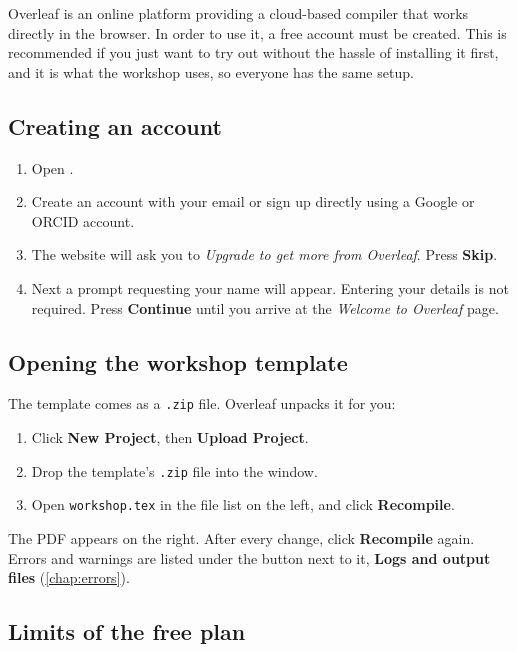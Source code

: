 Overleaf is an online platform providing a cloud-based  compiler that works directly in the browser.
In order to use it, a free account must be created.
This is recommended if you just want to try out  without the hassle of installing it first,
and it is what the workshop uses, so everyone has the same setup.

\subsection{Creating an account}

\begin{enumerate}
    \item Open .
    \item Create an account with your email or sign up directly using a Google or ORCID account.
    \item The website will ask you to \textit{Upgrade to get more from Overleaf}.
        Press \textbf{Skip}.
    \item Next a prompt requesting your name will appear.
        Entering your details is not required.
        Press \textbf{Continue} until you arrive at the \textit{Welcome to Overleaf} page.
\end{enumerate}

\subsection{Opening the workshop template}

The template comes as a \texttt{.zip} file.
Overleaf unpacks it for you:

\begin{enumerate}
    \item Click \textbf{New Project}, then \textbf{Upload Project}.
    \item Drop the template's \texttt{.zip} file into the window.
    \item Open \texttt{workshop.tex} in the file list on the left, and click \textbf{Recompile}.
\end{enumerate}

The PDF appears on the right.
After every change, click \textbf{Recompile} again.
Errors and warnings are listed under the button next to it,
\textbf{Logs and output files} (\autoref{chap:errors}).

\subsection{Limits of the free plan}

